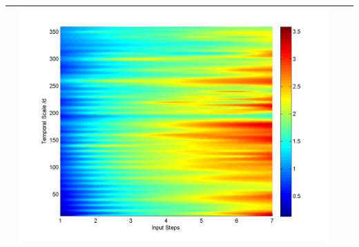 \documentclass[11pt]{article}
\begin{document}
\begin{table}[H]
{\begin{tabular}{c  c   c   c  }
&\begin{minipage}{.3\textwidth}\includegraphics[width=\linewidth]{resultgraph/02478500pepq.png}\end{minipage}
\\
\bottomrule
\end{tabular}
}
\end{table}
\end{document}
